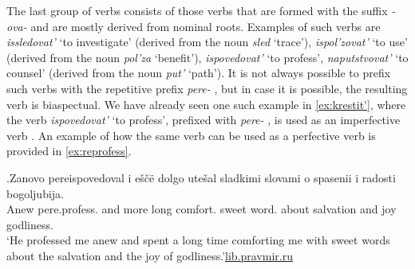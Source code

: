 The last group of verbs consists of those verbs that are formed with the suffix \textit{-ova-}   and are mostly derived from nominal roots. Examples of such verbs are \textit{issledovat'} `to investigate' (derived from the noun \textit{sled} `trace'), \textit{ispol'zovat'} `to use' (derived from the noun \textit{pol'za} `benefit'), \textit{ispovedovat'} `to profess', \textit{naputstvovat'} `to counsel' (derived from the noun \textit{put'} `path'). It is not always possible to prefix such verbs with the repetitive  prefix \textit{pere-}  , but in case it is possible, the resulting verb is biaspectual. We have already seen one such example in \ref{ex:krestit'}, where the verb \textit{ispovedovat'} `to profess', prefixed with \textit{pere-}  , is used as an imperfective verb . An example of how the same verb can be used as a perfective verb  is provided in \ref{ex:reprofess}.

\exg.\label{ex:reprofess}Zanovo pereispovedoval i e\v{s}\v{c}\"{e} dolgo ute\v{s}al sladkimi slovami o spasenii i radosti bogoljubija.\\
Anew pere.profess. and more long comfort. sweet word. about salvation and joy godliness.\\
\trans `He professed me anew and spent a long time comforting me with sweet words about the salvation and the joy of godliness.'\hbox{}\hfill\hbox{\url{lib.pravmir.ru}}


